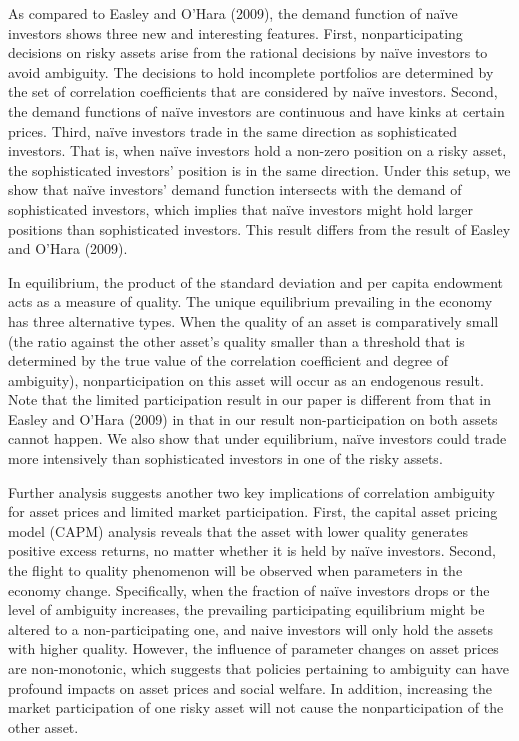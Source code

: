 \documentclass[10pt]{article}
\begin{document}
As compared to Easley and O'Hara (2009), the demand function of na\"ive investors shows three new and interesting features. First, nonparticipating decisions on risky assets arise from the rational decisions by na\"ive investors to avoid ambiguity. The decisions to hold incomplete portfolios are determined by the set of correlation coefficients that are considered by na\"ive investors. Second, the demand functions of na\"ive investors are continuous and have kinks at certain prices. Third, na\"ive investors trade in the same direction as sophisticated investors. That is, when na\"ive investors hold a non-zero position on a risky asset, the sophisticated investors' position is in the same direction. Under this setup, we show that na\"ive investors' demand function intersects with the demand of sophisticated investors, which implies that na\"ive investors might hold larger positions than sophisticated investors. This result differs from the result of Easley and O'Hara (2009).

In equilibrium, the product of the standard deviation and per capita endowment acts as a measure of quality. The unique equilibrium prevailing in the economy has three alternative types. When the quality of an asset is comparatively small (the ratio against the other asset's quality smaller than a threshold that is determined by the true value of the correlation coefficient and degree of ambiguity), nonparticipation on this asset will occur as an endogenous result. Note that the limited participation result in our paper is different from that in Easley and O'Hara (2009) in that in our result non-participation on both assets cannot happen. We also show that under equilibrium, na\"ive investors could trade more intensively than sophisticated investors in one of the risky assets.

Further analysis suggests another two key implications of correlation ambiguity for asset prices and limited market participation. First, the capital asset pricing model (CAPM) analysis reveals that the asset with lower quality generates positive excess returns, no matter whether it is held by na\"ive investors. Second, the flight to quality phenomenon will be observed when parameters in the economy change. Specifically, when the fraction of na\"ive investors drops or the level of ambiguity increases, the prevailing participating equilibrium might be altered to a non-participating one, and naive investors will only hold the assets with higher quality. However, the influence of parameter changes on asset prices are non-monotonic, which suggests that policies pertaining to ambiguity can have profound impacts on asset prices and social welfare. In addition, increasing the market participation of one risky asset will not cause the nonparticipation of the other asset. 
\end{document}
